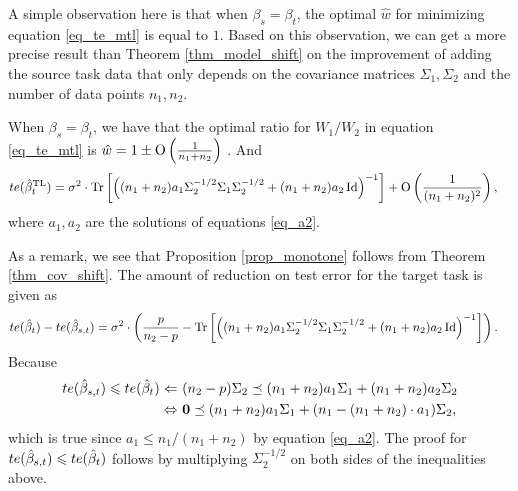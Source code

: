 A simple observation here is that when $\beta_s = \beta_t$, the optimal $\hat{w}$ for minimizing equation \eqref{eq_te_mtl} is equal to $1$.
Based on this observation, we can get a more precise result than Theorem \ref{thm_model_shift} on the improvement of adding the source task data that only depends on the covariance matrices $\Sigma_1, \Sigma_2$ and the number of data points $n_1, n_2$.

\begin{theorem}\label{thm_cov_shift}
	When $\beta_s = \beta_t$, we have that the optimal ratio for $W_1/W_2$ in equation \eqref{eq_te_mtl} is $\hat{w} = 1 \pm \operatorname{O}\left(\frac 1 {n_1+n_2}\right)$ .
	And
	\begin{align*}
		te(\hat{\beta}^{\text{TL}}_{t}) &= \sigma^2 \cdot \operatorname{Tr}\left[\left({(n_1 + n_2)a_1\Sigma_2^{-1/2}\Sigma_1\Sigma_2^{-1/2} + (n_1 + n_2)a_2\operatorname{Id}}\right)^{-1}\right] + \operatorname{O}\left(\frac 1 {(n_1 + n_2)^2}\right),
	\end{align*}
	where $a_1, a_2$ are the solutions of equations \eqref{eq_a2}.
\end{theorem}

As a remark, we see that Proposition \ref{prop_monotone} follows from Theorem \ref{thm_cov_shift}.
The amount of reduction on test error for the target task is given as
	\begin{align*}
		te(\hat{\beta}_t) - te(\hat{\beta}_{s,t})
		&= \sigma^2 \cdot \left({\frac p {n_2 - p} -  \operatorname{Tr}\left[\left({(n_1 + n_2)a_1\Sigma_2^{-1/2}\Sigma_1\Sigma_2^{-1/2} + (n_1 + n_2)a_2\operatorname{Id}}\right)^{-1}\right]}\right).
	\end{align*}
Because
\begin{align*}
	te(\hat{\beta}_{s,t}) \leqslant te(\hat{\beta}_t)
	\Leftarrow~ & (n_2 - p)\Sigma_2 \preceq (n_1 + n_2) a_1 \Sigma_1 + (n_1 + n_2)a_2 \Sigma_2 \\
	\Leftrightarrow~ & \mathbf{0} \preceq (n_1 + n_2) a_1 \Sigma_1 + (n_1 - (n_1 + n_2)\cdot a_1) \Sigma_2,
\end{align*}
which is true since $a_1 \le n_1 / (n_1 + n_2)$ by equation \eqref{eq_a2}.
The proof for $te(\hat{\beta}_{s,t}) \leqslant te(\hat{\beta}_t)$ follows by multiplying $\Sigma_2^{-1/2}$ on both sides of the inequalities above.

